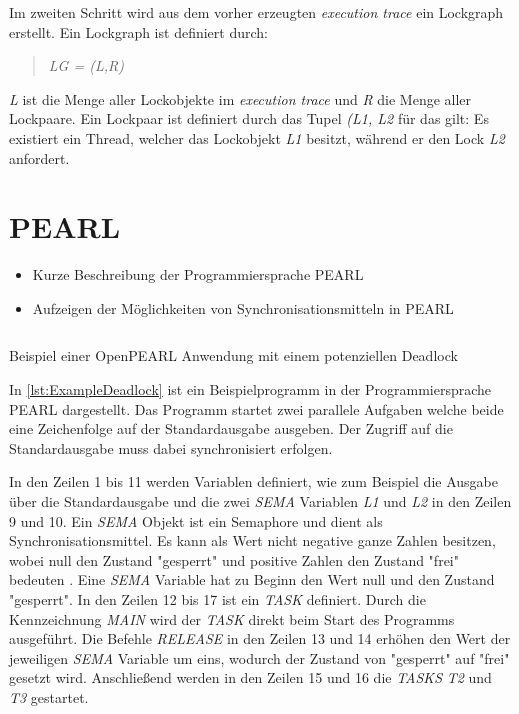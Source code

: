 Im zweiten Schritt wird aus dem vorher erzeugten \textit{execution trace} ein
Lockgraph erstellt. Ein Lockgraph ist definiert durch:
\begin{quote}
\textit{LG = (L,R)}
\end{quote}
\textit{L} ist die Menge aller Lockobjekte im \textit{execution trace} und
\textit{R} die Menge aller Lockpaare. Ein Lockpaar ist definiert durch das Tupel
\textit{(L1, L2} für das gilt: Es existiert ein
Thread, welcher das Lockobjekt \textit{L1} besitzt, während er
den Lock \textit{L2} anfordert.

\section{PEARL}
\label{section:PEARL}
\begin{itemize}
    \item Kurze Beschreibung der Programmiersprache PEARL
    \item Aufzeigen der Möglichkeiten von Synchronisationsmitteln in PEARL
\end{itemize}

\begin{listing}[ht]
  \inputminted[frame=lines,linenos]{vim}{./Examples/Example_Deadlock.prl}
  \caption{Beispiel einer OpenPEARL Anwendung mit einem potenziellen Deadlock}    
  \label{lst:ExampleDeadlock}   
\end{listing} 

In \cref{lst:ExampleDeadlock} ist ein Beispielprogramm in der Programmiersprache
PEARL dargestellt. Das Programm startet zwei parallele Aufgaben welche beide eine Zeichenfolge auf der Standardausgabe ausgeben. Der Zugriff auf die Standardausgabe muss dabei synchronisiert erfolgen.

In den Zeilen 1 bis 11 werden Variablen definiert, wie zum Beispiel die Ausgabe über die Standardausgabe und die zwei \textit{SEMA} Variablen \textit{L1} und \textit{L2} in den Zeilen 9 und 10. Ein \textit{SEMA} Objekt ist ein Semaphore und dient als Synchronisationsmittel. Es kann als Wert nicht negative ganze Zahlen besitzen, wobei null den Zustand "gesperrt" und positive Zahlen den Zustand "frei" bedeuten \autocite[9--17]{PEARL}. Eine \textit{SEMA} Variable hat zu Beginn den Wert null und den Zustand "gesperrt". In den Zeilen 12 bis 17 ist ein \textit{TASK} definiert. Durch die Kennzeichnung \textit{MAIN} wird der \textit{TASK} direkt beim Start des Programms ausgeführt. Die Befehle \textit{RELEASE} in den Zeilen 13 und 14 erhöhen den Wert der jeweiligen \textit{SEMA} Variable um eins, wodurch der Zustand von "gesperrt" auf "frei" gesetzt wird. Anschließend werden in den Zeilen 15 und 16 die \textit{TASKS} \textit{T2} und \textit{T3} gestartet.

